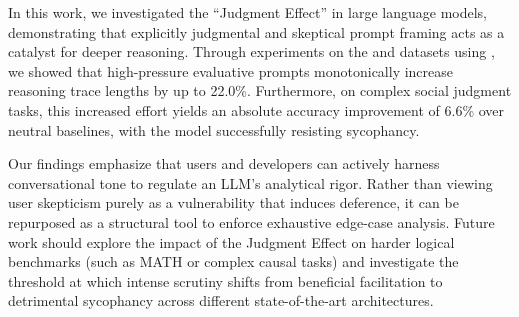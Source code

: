 In this work, we investigated the ``Judgment Effect'' in large language models, demonstrating that explicitly judgmental and skeptical prompt framing acts as a catalyst for deeper reasoning. Through experiments on the \raio and \causalt datasets using \gptmini, we showed that high-pressure evaluative prompts monotonically increase reasoning trace lengths by up to 22.0\%. Furthermore, on complex social judgment tasks, this increased effort yields an absolute accuracy improvement of 6.6\% over neutral baselines, with the model successfully resisting sycophancy.

Our findings emphasize that users and developers can actively harness conversational tone to regulate an LLM's analytical rigor. Rather than viewing user skepticism purely as a vulnerability that induces deference, it can be repurposed as a structural tool to enforce exhaustive edge-case analysis. Future work should explore the impact of the Judgment Effect on harder logical benchmarks (such as MATH or complex causal tasks) and investigate the threshold at which intense scrutiny shifts from beneficial facilitation to detrimental sycophancy across different state-of-the-art architectures.